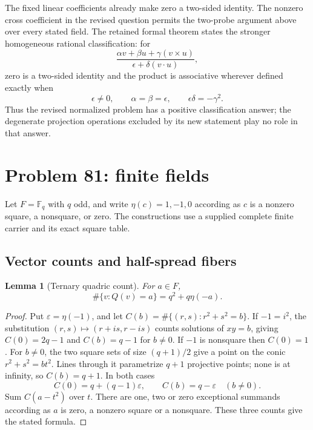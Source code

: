 \documentclass[11pt]{article}
\newcommand{\F}{\mathbb F}
\newtheorem{lemma}[theorem]{Lemma}
\theoremstyle{remark}
\begin{document}
The fixed linear coefficients already make zero a two-sided identity. The
nonzero cross coefficient in the revised question permits the two-probe
argument above over every stated field. The retained formal theorem states
the stronger homogeneous rational classification: for
\[
 \frac{\alpha v+\beta u+\gamma(v\times u)}
      {\epsilon+\delta(v\cdot u)},
\]
zero is a two-sided identity and the product is associative wherever defined
exactly when
\[
 \epsilon\ne0,\qquad\alpha=\beta=\epsilon,
 \qquad\epsilon\delta=-\gamma^2.
\]
Thus the revised normalized problem has a positive classification answer;
the degenerate projection operations excluded by its new statement play no
role in that answer.

\section{Problem 81: finite fields}

Let \(F=\F_q\) with \(q\) odd, and write \(\eta(c)=1,-1,0\) according as
\(c\) is a nonzero square, a nonsquare, or zero. The constructions use a
supplied complete finite carrier and its exact square table.

\subsection{Vector counts and half-spread fibers}

\begin{lemma}[Ternary quadric count]
For \(a\in F\),
\[
 \#\{v:Q(v)=a\}=q^2+q\eta(-a).
\]
\end{lemma}
\begin{proof}
Put \(\varepsilon=\eta(-1)\), and let
\(C(b)=\#\{(r,s):r^2+s^2=b\}\). If \(-1=i^2\), the substitution
\((r,s)\mapsto(r+is,r-is)\) counts solutions of \(xy=b\), giving
\(C(0)=2q-1\) and \(C(b)=q-1\) for \(b\ne0\).
If \(-1\) is nonsquare then \(C(0)=1\). For \(b\ne0\), the two square
sets of size \((q+1)/2\) give a point on the conic
\(r^2+s^2=bt^2\). Lines through it parametrize \(q+1\) projective points;
none is at infinity, so \(C(b)=q+1\). In both cases
\[
 C(0)=q+(q-1)\varepsilon,\qquad C(b)=q-\varepsilon\quad(b\ne0).
\]
Sum \(C(a-t^2)\) over \(t\). There are one, two or zero exceptional
summands according as \(a\) is zero, a nonzero square or a nonsquare. These
three counts give the stated formula.
\end{proof}
\end{document}
